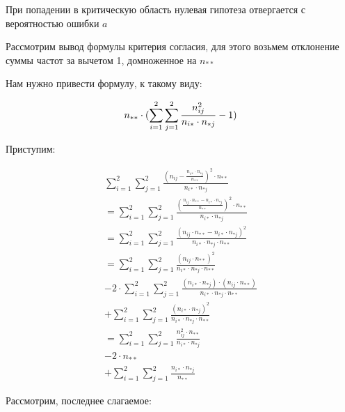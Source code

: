 \documentclass{article}
\begin{document}
    При попадении в критическую область нулевая гипотеза отвергается с вероятностью ошибки $a$

    \quad

    Рассмотрим вывод формулы критерия согласия, для этого возьмем отклонение суммы частот за вычетом 1, домноженное на $n_{**}$

    \quad

    Нам нужно привести формулу, к такому виду:

    \quad

    \begin{equation}
        n_{**} \cdot (\sum_{i=1}^{2} { \sum_{j=1}^{2}{\frac{n_{ij}^{2}}{n_{i*} \cdot n_{*j} }}} - 1) \\
    \end{equation}

    \quad

    Приступим:

    \quad

    \[
    \begin{gathered}
         \sum_{i=1}^{2}{\sum_{j=1}^{2}{ \frac{( n_{ij} - \frac{n_{i*} \cdot n_{*j}}{n_{**}} )^{2} \cdot n_{**}}{n_{i*} \cdot n_{*j} } } } \\
         = \sum_{i=1}^{2}{\sum_{j=1}^{2}{ \frac{( \frac{n_{ij} \cdot n_{**} - n_{i*} \cdot n_{*j}}{n_{**}} )^{2} \cdot n_{**}}{n_{i*} \cdot n_{*j} } } } \\
         = \sum_{i=1}^{2}{\sum_{j=1}^{2}{ \frac{( n_{ij} \cdot n_{**} - n_{i*} \cdot n_{*j} )^{2} }{n_{i*} \cdot n_{*j} \cdot n_{**} } } } \\
         = \sum_{i=1}^{2}{\sum_{j=1}^{2}{  \frac{(n_{ij} \cdot n_{**})^{2}}{ n_{i*} \cdot n_{*j} \cdot n_{**} }  }} \\
         - 2 \cdot \sum_{i=1}^{2}{\sum_{j=1}^{2}{   \frac{(n_{i*} \cdot n_{*j}) \cdot (n_{ij} \cdot n_{**})}{ n_{i*} \cdot n_{*j} \cdot n_{**}}  }} \\
         + \sum_{i=1}^{2}{\sum_{j=1}^{2}{   \frac{(n_{i*} \cdot n_{*j})^{2}}{n_{i*} \cdot n_{*j} \cdot n_{**}}  }} \\
         = \sum_{i=1}^{2}{\sum_{j=1}^{2}{  \frac{n_{ij}^{2} \cdot n_{**}}{ n_{i*} \cdot n_{*j} }  }} \\
         - 2 \cdot n_{**} \\
         + \sum_{i=1}^{2}{\sum_{j=1}^{2}{   \frac{n_{i*} \cdot n_{*j}}{ n_{**}}  }}
    \end{gathered}
    \]

    \quad

    Рассмотрим, последнее слагаемое:
\end{document}
